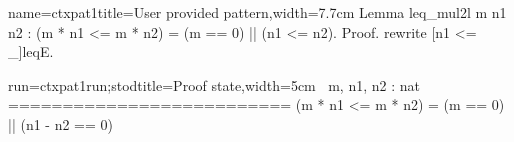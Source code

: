 \begin{coq-left}{name=ctxpat1}{title=User provided pattern,width=7.7cm}
Lemma leq_mul2l m n1 n2 :
(m * n1 <= m * n2) =
  (m == 0) || (n1 <= n2).
Proof.
rewrite [n1 <= _]leqE.
\end{coq-left}
\begin{coqout-right}{run=ctxpat1run;stod}{title=Proof state,width=5cm}
$~$
m, n1, n2 : nat
==========================
(m * n1 <= m * n2) =
  (m == 0) || (n1 - n2 == 0)
\end{coqout-right}

%

